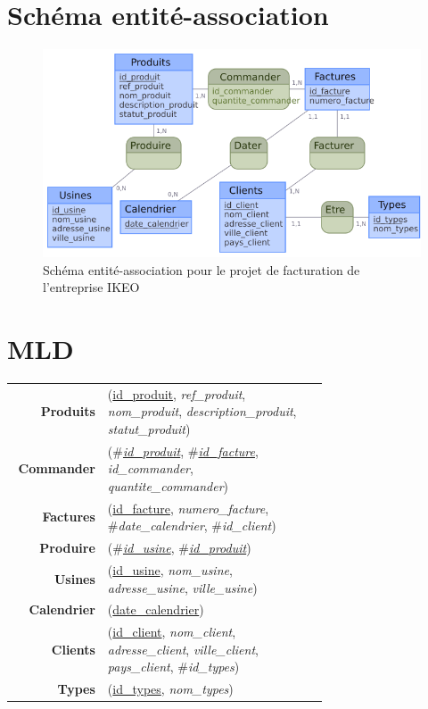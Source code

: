 \documentclass[french]{article}
\newenvironment{mld}
  {\par\begin{minipage}{\linewidth}\begin{tabular}{rp{0.7\linewidth}}}
  {\end{tabular}\end{minipage}\par}
\newcommand{\attr}[1]{\emph{#1}}
\newcommand{\prim}[1]{\uline{#1}}
\newcommand{\foreign}[1]{\#\textsl{#1}}
\begin{document}
\section{Schéma entité-association}

\begin{figure}[!htbp]
    \centering
    \includegraphics[width=\textwidth]{Rapport/Image/schema_EA.png}
    \caption{Schéma entité-association pour le projet de facturation de l'entreprise IKEO}
    \label{fig:schema_bdd}
\end{figure}
    
\section{MLD}


\begin{mld}
  \textbf{Produits} & (\prim{id\_produit}, \attr{ref\_produit}, \attr{nom\_produit}, \attr{description\_produit}, \attr{statut\_produit})\\
  \textbf{Commander} & (\foreign{\prim{id\_produit}}, \foreign{\prim{id\_facture}}, \attr{id\_commander}, \attr{quantite\_commander})\\
  \textbf{Factures} & (\prim{id\_facture}, \attr{numero\_facture}, \foreign{date\_calendrier}, \foreign{id\_client})\\
  \textbf{Produire} & (\foreign{\prim{id\_usine}}, \foreign{\prim{id\_produit}})\\
  \textbf{Usines} & (\prim{id\_usine}, \attr{nom\_usine}, \attr{adresse\_usine}, \attr{ville\_usine})\\
  \textbf{Calendrier} & (\prim{date\_calendrier})\\
  \textbf{Clients} & (\prim{id\_client}, \attr{nom\_client}, \attr{adresse\_client}, \attr{ville\_client}, \attr{pays\_client}, \foreign{id\_types})\\
  \textbf{Types} & (\prim{id\_types}, \attr{nom\_types})\\
\end{mld}
\end{document}
